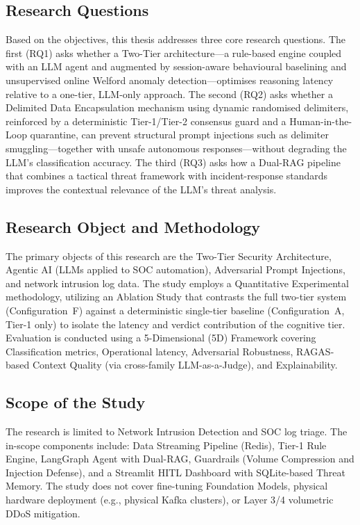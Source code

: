 \documentclass[12pt,a4paper]{article}
\begin{document}
\subsection{Research Questions}
Based on the objectives, this thesis addresses three core research questions. The first (RQ1) asks whether a Two-Tier architecture---a rule-based engine coupled with an LLM agent and augmented by session-aware behavioural baselining and unsupervised online Welford anomaly detection---optimises reasoning latency relative to a one-tier, LLM-only approach. The second (RQ2) asks whether a Delimited Data Encapsulation mechanism using dynamic randomised delimiters, reinforced by a deterministic Tier-1/Tier-2 consensus guard and a Human-in-the-Loop quarantine, can prevent structural prompt injections such as delimiter smuggling---together with unsafe autonomous responses---without degrading the LLM's classification accuracy. The third (RQ3) asks how a Dual-RAG pipeline that combines a tactical threat framework with incident-response standards improves the contextual relevance of the LLM's threat analysis.

\subsection{Research Object and Methodology}
The primary objects of this research are the Two-Tier Security Architecture, Agentic AI (LLMs applied to SOC automation), Adversarial Prompt Injections, and network intrusion log data.
The study employs a Quantitative Experimental methodology, utilizing an Ablation Study that contrasts the full two-tier system (Configuration~F) against a deterministic single-tier baseline (Configuration~A, Tier-1 only) to isolate the latency and verdict contribution of the cognitive tier. Evaluation is conducted using a 5-Dimensional (5D) Framework covering Classification metrics, Operational latency, Adversarial Robustness, RAGAS-based Context Quality (via cross-family LLM-as-a-Judge), and Explainability.

\subsection{Scope of the Study}
The research is limited to Network Intrusion Detection and SOC log triage. The in-scope components include: Data Streaming Pipeline (Redis), Tier-1 Rule Engine, LangGraph Agent with Dual-RAG, Guardrails (Volume Compression and Injection Defense), and a Streamlit HITL Dashboard with SQLite-based Threat Memory. The study does not cover fine-tuning Foundation Models, physical hardware deployment (e.g., physical Kafka clusters), or Layer 3/4 volumetric DDoS mitigation.
\end{document}
